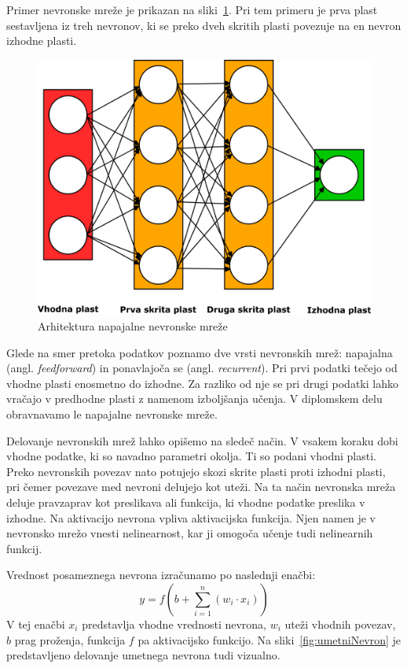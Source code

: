 \documentclass[cover]{thesis}
\begin{document}
Primer nevronske mreže je prikazan na sliki~\ref{fig:NeuralNetwork}. Pri tem primeru je prva plast sestavljena iz treh nevronov, ki se preko dveh skritih plasti povezuje na en nevron izhodne plasti.
\begin{figure}[H]
    \includegraphics[width=\textwidth]{NeuralNetwork.png}
    \caption{Arhitektura napajalne nevronske mreže}\label{fig:NeuralNetwork}
\end{figure}

Glede na smer pretoka podatkov poznamo dve vrsti nevronskih mrež: napajalna (angl. \emph{feedforward}) in ponavlajoča se (angl. \emph{recurrent}). Pri prvi podatki tečejo od vhodne plasti enosmetno do izhodne. Za razliko od nje se pri drugi podatki lahko vračajo v predhodne plasti z namenom izboljšanja učenja. V diplomskem delu obravnavamo le napajalne nevronske mreže.

Delovanje nevronskih mrež lahko opišemo na sledeč način. V vsakem koraku dobi vhodne podatke, ki so navadno parametri okolja. Ti so podani vhodni plasti. Preko nevronskih povezav nato potujejo skozi skrite plasti proti izhodni plasti, pri čemer povezave med nevroni delujejo kot uteži. Na ta način nevronska mreža deluje pravzaprav kot preslikava ali funkcija, ki vhodne podatke preslika v izhodne. Na aktivacijo nevrona vpliva aktivacijska funkcija. Njen namen je v nevronsko mrežo vnesti nelinearnost, kar ji omogoča učenje tudi nelinearnih funkcij.

Vrednost posameznega nevrona izračunamo po naslednji enačbi:
\begin{equation}\label{eq:NeuronOutput}
    y = f\left(b + \sum_{i=1}^{n} (w_i \cdot x_i)\right)
\end{equation}
V tej enačbi $x_i$ predstavlja vhodne vrednosti nevrona, $w_i$ uteži vhodnih povezav, $b$ prag proženja, funkcija $f$ pa aktivacijsko funkcijo. Na sliki~\ref{fig:umetniNevron} je predstavljeno delovanje umetnega nevrona tudi vizualno.
\end{document}
